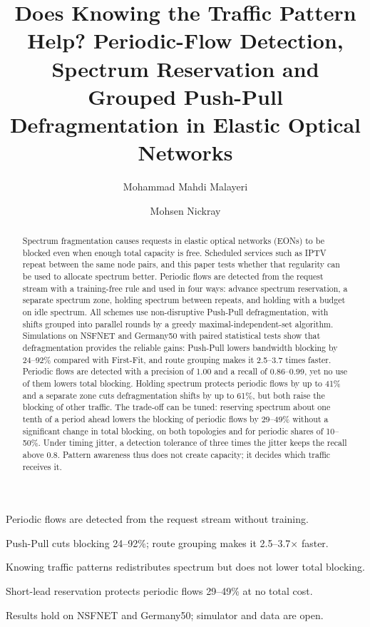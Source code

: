 \documentclass[preprint,12pt]{elsarticle}
\newcommand{\todo}[1]{\textcolor{red}{[TODO: #1]}}
\begin{document}
\begin{frontmatter}

\title{Does Knowing the Traffic Pattern Help? Periodic-Flow Detection, Spectrum Reservation and Grouped Push-Pull Defragmentation in Elastic Optical Networks}

\author[qom]{Mohammad Mahdi Malayeri}
\author[qom]{Mohsen Nickray}
\ead{\todo{email}}
\cortext[cor1]{Corresponding author. \todo{Confirm the corresponding author with Dr Nickray.}}

\begin{abstract}
Spectrum fragmentation causes requests in elastic optical networks (EONs) to be blocked even when enough total capacity is free. Scheduled services such as IPTV repeat between the same node pairs, and this paper tests whether that regularity can be used to allocate spectrum better. Periodic flows are detected from the request stream with a training-free rule and used in four ways: advance spectrum reservation, a separate spectrum zone, holding spectrum between repeats, and holding with a budget on idle spectrum. All schemes use non-disruptive Push-Pull defragmentation, with shifts grouped into parallel rounds by a greedy maximal-independent-set algorithm. Simulations on NSFNET and Germany50 with paired statistical tests show that defragmentation provides the reliable gains: Push-Pull lowers bandwidth blocking by 24--92\% compared with First-Fit, and route grouping makes it 2.5--3.7 times faster. Periodic flows are detected with a precision of 1.00 and a recall of 0.86--0.99, yet no use of them lowers total blocking. Holding spectrum protects periodic flows by up to 41\% and a separate zone cuts defragmentation shifts by up to 61\%, but both raise the blocking of other traffic. The trade-off can be tuned: reserving spectrum about one tenth of a period ahead lowers the blocking of periodic flows by 29--49\% without a significant change in total blocking, on both topologies and for periodic shares of 10--50\%. Under timing jitter, a detection tolerance of three times the jitter keeps the recall above 0.8. Pattern awareness thus does not create capacity; it decides which traffic receives it.
\end{abstract}

\begin{highlights}
\item Periodic flows are detected from the request stream without training.
\item Push-Pull cuts blocking 24--92\%; route grouping makes it 2.5--3.7$\times$ faster.
\item Knowing traffic patterns redistributes spectrum but does not lower total blocking.
\item Short-lead reservation protects periodic flows 29--49\% at no total cost.
\item Results hold on NSFNET and Germany50; simulator and data are open.
\end{highlights}


\end{frontmatter}
\end{document}
